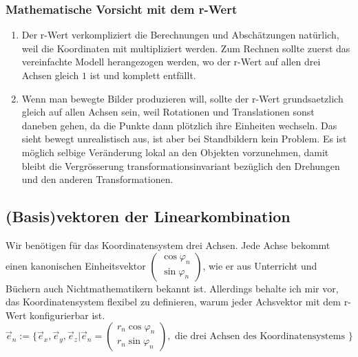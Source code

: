 \documentclass[a4paper]{article}
\begin{document}
\subsubsection{Mathematische Vorsicht mit dem r-Wert}

\begin{enumerate}

\item Der r-Wert verkompliziert die Berechnungen und Absch\"atzungen nat\"urlich, weil die Koordinaten mit multipliziert werden. Zum Rechnen sollte zuerst das vereinfachte Modell herangezogen werden, wo der r-Wert auf allen drei Achsen gleich $1$ ist und komplett 
entf\"allt.\\

\item Wenn man bewegte Bilder produzieren will, sollte der r-Wert grundsaetzlich gleich auf allen Achsen sein, weil Rotationen und Translationen sonst daneben gehen, da die Punkte dann pl\"otzlich ihre Einheiten wechseln. Das sieht bewegt unrealistisch aus, ist aber
bei Standbildern kein Problem. Es ist m\"oglich selbige Ver\"anderung lokal an den Objekten vorzunehmen, damit bleibt die Vergr\"osserung transformationsinvariant bez\"uglich den Drehungen und den anderen Transformationen.\\

\end{enumerate}

\subsection{(Basis)vektoren der Linearkombination}

Wir ben\"otigen f\"ur das Koordinatensystem drei Achsen. Jede Achse bekommt einen kanonischen Einheitsvektor $\begin{pmatrix}\cos\varphi_n\\\sin\varphi_n\end{pmatrix}$, wie er aus Unterricht und B\"uchern auch Nichtmathematikern bekannt ist. Allerdings behalte ich mir vor, das Koordinatensystem flexibel zu definieren, warum jeder Achsvektor mit dem r-Wert konfigurierbar ist.\\

\begin{displaymath}
\vec{e}_n := \{ \vec{e}_x, \vec{e}_y, \vec{e}_z | \vec{e}_n = \begin{pmatrix}r_n \cos \varphi_n\\r_n \sin \varphi_n\end{pmatrix}, \mbox{ die drei Achsen des Koordinatensystems }\}
\end{displaymath}
\end{document}
